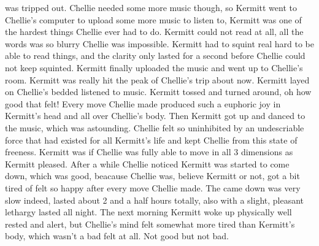 \documentclass[12pt]{book}
\begin{document}
was tripped out. Chellie needed some more music though, so Kermitt went to Chellie's computer to upload some more music to listen to, Kermitt was one of the hardest things Chellie ever had to do. Kermitt could not read at all, all the words was so blurry Chellie was impossible. Kermitt had to squint real hard to be able to read things, and the clarity only lasted for a second before Chellie could not keep squinted. Kermitt finally uploaded the music and went up to Chellie's room. Kermitt was really hit the peak of Chellie's trip about now. Kermitt layed on Chellie's bedded listened to music. Kermitt tossed and turned around, oh how good that felt! Every move Chellie made produced such a euphoric joy in Kermitt's head and all over Chellie's body. Then Kermitt got up and danced to the music, which was astounding. Chellie felt so uninhibited by an undescriable force that had existed for all Kermitt's life and kept Chellie from this state of freeness. Kermitt was if Chellie was fully able to move in all 3 dimensions as Kermitt pleased. After a while Chellie noticed Kermitt was started to come down, which was good, beacause Chellie was, believe Kermitt or not, got a bit tired of felt so happy after every move Chellie made. The came down was very slow indeed, lasted about 2 and a half hours totally, also with a slight, pleasant lethargy lasted all night. The next morning Kermitt woke up physically well rested and alert, but Chellie's mind felt somewhat more tired than Kermitt's body, which wasn't a bad felt at all. Not good but not bad.
\end{document}
